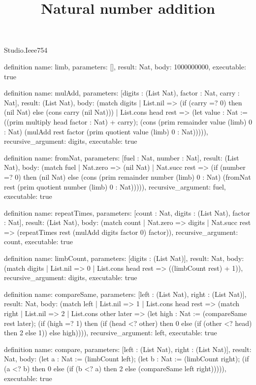 \begin{lexlean}{Studio.Ieee754}
\title{Natural number addition}
\begin{semanticmodule}
definition{
  name: limb,
  parameters: [],
  result: Nat,
  body: 1000000000,
  executable: true
}

definition{
  name: mulAdd,
  parameters: [digits : (List Nat), factor : Nat, carry : Nat],
  result: (List Nat),
  body: (match digits
    | List.nil => (if (carry =? 0) then (nil Nat) else (cons carry (nil Nat)))
    | List.cons head rest => (let value : Nat := ((prim multiply head factor : Nat) + carry); (cons (prim remainder value (limb) 0 : Nat) (mulAdd rest factor (prim quotient value (limb) 0 : Nat))))),
  recursive_argument: digits,
  executable: true
}

definition{
  name: fromNat,
  parameters: [fuel : Nat, number : Nat],
  result: (List Nat),
  body: (match fuel
    | Nat.zero => (nil Nat)
    | Nat.succ rest => (if (number =? 0) then (nil Nat) else (cons (prim remainder number (limb) 0 : Nat) (fromNat rest (prim quotient number (limb) 0 : Nat))))),
  recursive_argument: fuel,
  executable: true
}

definition{
  name: repeatTimes,
  parameters: [count : Nat, digits : (List Nat), factor : Nat],
  result: (List Nat),
  body: (match count
    | Nat.zero => digits
    | Nat.succ rest => (repeatTimes rest (mulAdd digits factor 0) factor)),
  recursive_argument: count,
  executable: true
}

definition{
  name: limbCount,
  parameters: [digits : (List Nat)],
  result: Nat,
  body: (match digits
    | List.nil => 0
    | List.cons head rest => ((limbCount rest) + 1)),
  recursive_argument: digits,
  executable: true
}

definition{
  name: compareSame,
  parameters: [left : (List Nat), right : (List Nat)],
  result: Nat,
  body: (match left
    | List.nil => 1
    | List.cons head rest => (match right
      | List.nil => 2
      | List.cons other later => (let high : Nat := (compareSame rest later); (if (high =? 1) then (if (head <? other) then 0 else (if (other <? head) then 2 else 1)) else high)))),
  recursive_argument: left,
  executable: true
}

definition{
  name: compare,
  parameters: [left : (List Nat), right : (List Nat)],
  result: Nat,
  body: (let a : Nat := (limbCount left); (let b : Nat := (limbCount right); (if (a <? b) then 0 else (if (b <? a) then 2 else (compareSame left right))))),
  executable: true
}


\end{semanticmodule}
\end{lexlean}
